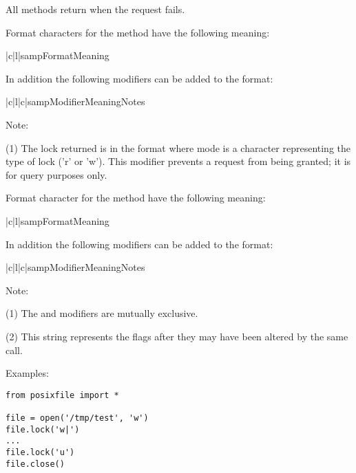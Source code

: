 All methods return  when the request fails.

Format characters for the  method have the following meaning:

\begin{tableii}{|c|l|}{samp}{Format}{Meaning}
\end{tableii}

In addition the following modifiers can be added to the format:

\begin{tableiii}{|c|l|c|}{samp}{Modifier}{Meaning}{Notes}
\end{tableiii}

Note:

(1) The lock returned is in the format  where mode is a character representing the type of lock
('r' or 'w').  This modifier prevents a request from being granted; it
is for query purposes only.

Format character for the  method have the following meaning:

\begin{tableii}{|c|l|}{samp}{Format}{Meaning}
\end{tableii}

In addition the following modifiers can be added to the format:

\begin{tableiii}{|c|l|c|}{samp}{Modifier}{Meaning}{Notes}
\end{tableiii}

Note:

(1) The \code{!} and \code{=} modifiers are mutually exclusive.

(2) This string represents the flags after they may have been altered
by the same call.

Examples:

\begin{verbatim}
from posixfile import *

file = open('/tmp/test', 'w')
file.lock('w|')
...
file.lock('u')
file.close()
\end{verbatim}
